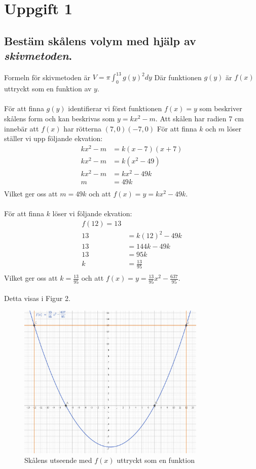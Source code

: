 \documentclass[12pt]{article}
\begin{document}
\section*{Uppgift 1}
\subsection*{Bestäm skålens volym med hjälp av {\it skivmetoden}.}
Formeln för skivmetoden är $V=\pi\int_{0}^{13}{g(y)}^2dy$
Där funktionen $g(y)$ är $f(x)$ uttryckt som en funktion av $y$.
\\\\
För att finna $g(y)$ identifierar vi först funktionen $f(x)=y$ som beskriver skålens form och kan beskrivas som $y=kx^2-m$. Att skålen har radien 7 cm innebär att $f(x)$ har rötterna $(7,0) (-7,0)$
För att finna $k$ och $m$ löser ställer vi upp följande ekvation:\\
\begin{align*}
    kx^2-m&=k(x-7)(x+7)\\
    kx^2-m&=k(x^2-49)\\
    kx^2-m&=kx^2-49k\\
    m&=49k\\
\end{align*}
Vilket ger oss att $m=49k$ och att $f(x)=y=kx^2-49k$.
\\\\
För att finna $k$ löser vi följande ekvation:
\begin{align*}
    f(12)=13\\
    13&=k{(12)}^2-49k\\
    13&=144k-49k\\
    13&=95k\\
    k&=\frac{13}{95}\\
\end{align*}
Vilket ger oss att $k=\frac{13}{95}$ och att $f(x)=y=\frac{13}{95}x^2-\frac{637}{95}$.
\\\\
Detta visas i Figur 2.
\begin{figure}[h]
    \centering
    \includegraphics[width=0.8\textwidth]{figur2.jpg}
    \caption{Skålens utseende med $f(x)$ uttryckt som en funktion}
\end{figure}
\end{document}
